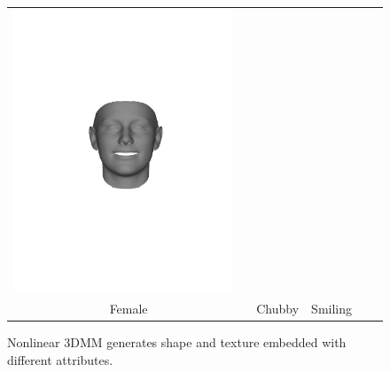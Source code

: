 \begin{figure}[t!]
\begin{center}
\begin{tabular}{ @{\hskip 1.5mm}c@{}c@{\hskip 1.5mm}c@{}c@{}c@{}c@{}c@{\hskip 1.5mm}c@{}}
\includegraphics[trim=150 250 175 250,clip, width=\afifthcolumn]{img/representation/pred_shape_Smiling.pdf} &
\\
\multicolumn{2}{c}{Female} & \multicolumn{2}{c}{Chubby} & \multicolumn{2}{c}{Smiling} \\
\end{tabular}
\vspace{-2mm}
\caption{\small Nonlinear 3DMM generates shape and texture embedded with different attributes.}
\label{fig:meaningful_basis}\figvspace \vspace{-2mm}
\end{center}
\end{figure}






